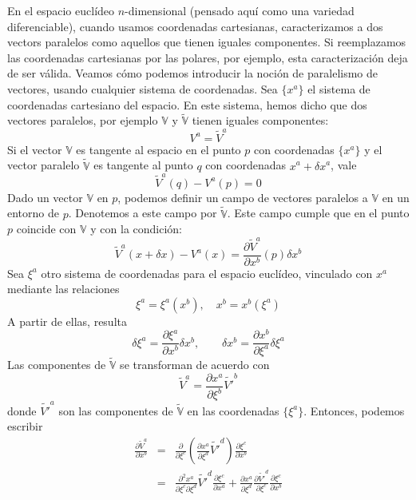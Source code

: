 {}
\label{s:WL:EstructuraAfin}

En  el espacio  eucl\'ideo  $n$-dimensional (pensado  aqu\'i  como una  variedad
diferenciable),  cuando  usamos coordenadas  cartesianas,  caracterizamos a  dos
vectors paralelos como aquellos  que tienen iguales componentes. Si reemplazamos
las coordenadas cartesianas por las polares, por ejemplo, esta caracterizaci\'on
deja  de  ser  v\'alida.  Veamos   c\'omo  podemos  introducir  la  noci\'on  de
paralelismo de vectores, usando  cualquier sistema de coordenadas. Sea $\{x^a\}$
el sistema de  coordenadas cartesiano del espacio. En  este sistema, hemos dicho
que  dos vectores  paralelos,  por ejemplo  $\mathbb{V}$ y  $\tilde{\mathbb{V}}$
tienen iguales componentes:
%
\[
V^a = \tilde{V}^a
\]
%
Si el vector $\mathbb{V}$ es tangente al espacio en el punto $p$ con coordenadas
$\{ x^a \}$  y el vector paralelo $\tilde{\mathbb{V}}$ es  tangente al punto $q$
con coordenadas ${x^a+\delta x^a}$, vale
%
\[
\tilde{V}^a(q)-V^a(p) = 0
\]
%
Dado  un  vector $\mathbb{V}$  en  $p$, podemos  definir  un  campo de  vectores
paralelos  a $\mathbb{V}$  en un  entorno  de $p$.  Denotemos a  este campo  por
$\tilde{\mathbb{V}}$.  Este  campo cumple  que  en  el  punto $p$  coincide  con
$\mathbb{V}$ y con la condici\'on:
%
\[
\tilde{V}^a(x+\delta x) -  V^a(x) = \frac{\partial \tilde{V}^a}{\partial x^b}(p)
\delta x^b
\]
%
Sea ${\xi^a}$ otro sistema de  coordenadas para el espacio eucl\'ideo, vinculado
con ${x^a}$ mediante las relaciones
%
\begin{equation}
\xi^a = \xi^a(x^b), \quad x^b=x^b(\xi^a) \label{cambcoor}
\end{equation}
%
A partir de ellas, resulta
%
\begin{equation}
\delta \xi^a = \frac{\partial \xi^a}{\partial x^b} \delta x^b, \qquad \delta x^b = \frac{\partial x^b}{\partial \xi^a} \delta \xi^a
\end{equation}
%
Las componentes de $\tilde{\mathbb{V}}$ se transforman de acuerdo con
%
\[
\tilde{V}^a = \frac{\partial x^a}{\partial \xi^b} \tilde{V'}^b
\]
%
donde  $\tilde{V'}^a$  son  las   componentes  de  $\tilde{\mathbb{V}}$  en  las
coordenadas $\{\xi^a\}$. Entonces, podemos escribir
%
\begin{eqnarray}
\frac{\partial \tilde{V}^a}{\partial x^b} &=& \frac{\partial}{\partial \xi^c} \left(\frac{\partial x^a}{\partial \xi^d} \tilde{V'}^d \right) \frac{\partial \xi^c}{\partial x^b}  \nonumber \\
%
& = & \frac{\partial^2 x^a}{\partial \xi^c \partial \xi^d} \tilde{V'}^d \frac{\partial \xi^c}{\partial x^a}+ \frac{\partial x^a}{\partial \xi^d} \frac{\partial{\tilde{V'}^d}}{\partial \xi^c} \frac{\partial \xi^c}{\partial x^b}
\end{eqnarray}
